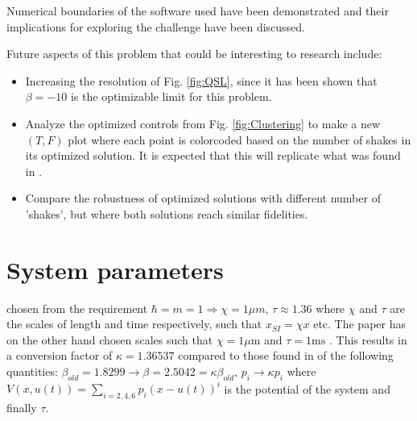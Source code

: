 \documentclass[a4paper, twocolumn]{revtex4-1}
\begin{document}
Numerical boundaries of the software used have been demonstrated and their implications for exploring the challenge have been discussed.

Future aspects of this problem that could be interesting to research include:
\begin{itemize}
	\item Increasing the resolution of Fig. \ref{fig:QSL}, since it has been shown that $\beta=-10$ is the optimizable limit for this problem.
	\item Analyze the optimized controls from Fig. \ref{fig:Clustering} to make a new $(T,F)$ plot where each point is colorcoded based on the number of shakes in its optimized solution. It is expected that this will replicate what was found in \cite{QM2Paper}.
	\item Compare the robustness of optimized solutions with different number of 'shakes', but where both solutions reach similar fidelities.
\end{itemize}



\appendix
\section{System parameters}\label{App:System-params}

chosen from the requirement $\hbar = m = 1 \Rightarrow \chi = 1\mu m, \, \tau \approx 1.36$ where $\chi$ and $\tau$ are the scales of length and time respectively, such that $x_{SI}=\chi x$ etc. The paper has on the other hand chosen scales such that $\chi = 1 \mu\text{m}$ and $\tau = 1 \text{ms}$ \cite{QEngine}. This results in a conversion factor of $\kappa = 1.36537$ compared to those found in \cite{QEngine} of the following quantities: $\beta_{old} = 1.8299 \rightarrow \beta = 2.5042 = \kappa \beta_{old}$, $p_i \rightarrow \kappa p_i$ where $V(x,u(t)) = \sum_{i=2,4,6} p_i (x-u(t))^i$ is the potential of the system and finally $\tau$. \\
\end{document}
